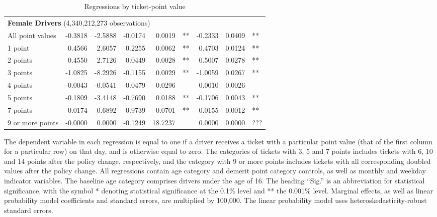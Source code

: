 \begin{table}
\begin{tabular}{l r r r r l r r l}
\hline 

\multicolumn{8}{l}{\textbf{Female Drivers} (4,340,212,273 observations)} \\ 

All point values                &  -0.3818        &  -2.5888       &  -0.0174        &  0.0019       &   **       &  -0.2333        &  0.0409       &   **       \\ 
1 point                         &  0.4566        &  2.6057       &  0.2255        &  0.0062       &   **       &  0.4703        &  0.0124       &   **       \\ 
2 points                        &  0.4550        &  2.7126       &  0.0449        &  0.0028       &   **       &  0.5007        &  0.0278       &   **       \\ 
3 points                        &  -1.0825        &  -8.2926       &  -0.1155        &  0.0029       &   **       &  -1.0059        &  0.0267       &   **       \\ 
4 points                        &  -0.0043        &  -0.0541       &  -0.0479        &  0.0296       &            &  0.0010        &  0.0026       &            \\ 
5 points                        &  -0.1809        &  -3.4148       &  -0.7690        &  0.0188       &   **       &  -0.1706        &  0.0043       &   **       \\ 
7 points                        &  -0.0174        &  -0.6892       &  -0.9739        &  0.0701       &   **       &  -0.0155        &  0.0012       &   **       \\ 
9 or more points                &  -0.0000        &  0.0000       &  -0.1249        &  18.7237       &            &  0.0000        &  0.0000       &  ???       \\ 

\hline 

\end{tabular} 
\caption{Regressions by ticket-point value} 
The dependent variable in each regression is equal to one  
if a driver receives a ticket with a particular point value   
(that of the first column for a particular row) on that day,  
and is otherwise equal to zero. 
The categories of tickets with 3, 5 and 7 points includes tickets  
with 6, 10 and 14 points after the policy change, respectively,  
and the category with 9 or more points includes tickets  
with all corresponding doubled values after the policy change. 
All regressions contain age category and demerit point category controls, 
as well as monthly and weekday indicator variables. 
The baseline age category comprises drivers under the age of 16. 
The heading ``Sig.'' is an abbreviation for statistical significance, with 
the symbol * denoting statistical significance at the 0.1\% level 
and ** the 0.001\% level. 
Marginal effects, as well as linear probability model coefficients and standard errors, are  
multiplied by 100,000.  
The linear probability model uses heteroskedasticity-robust standard errors.  
\label{tab:seas_Logit_vs_LPMx100K_regs_by_points} 
\end{table} 
 
